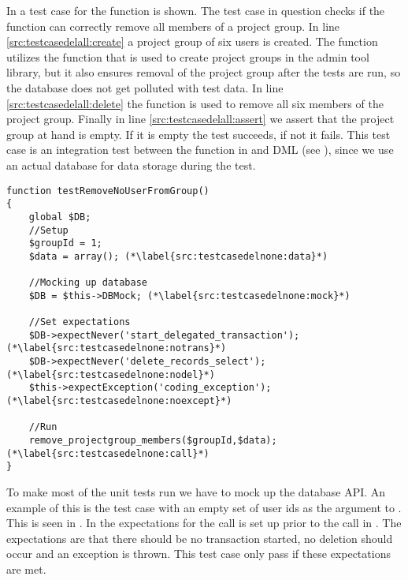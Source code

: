 In  a test case for the function  is shown.
The test case in question checks if the function can correctly remove all members of a project group. 
In line \ref{src:testcasedelall:create} a project group of six users is created.
The function  utilizes the function that is used to create project groups in the admin tool library, but it also ensures removal of the project group after the tests are run, so the database does not get polluted with test data.
In line \ref{src:testcasedelall:delete} the function  is used to remove all six members of the project group.
Finally in line \ref{src:testcasedelall:assert} we assert that the project group at hand is empty.
If it is empty the test succeeds, if not it fails.
This test case is an integration test between the function  in \admlib{} and \moodle{} DML (see ), since we use an actual database for data storage during the test.


\begin{lstlisting}[style=phpCode, caption=\myCaption{A test case for the function \fu{remove\_projectgroup\_members}. The test case tests if the function correctly handles the erronous input of an empty set of users}, label=src:testcasedelnone]
function testRemoveNoUserFromGroup()
{
	global $DB;
	//Setup
	$groupId = 1;
	$data = array(); (*\label{src:testcasedelnone:data}*)
	
	//Mocking up database
	$DB = $this->DBMock; (*\label{src:testcasedelnone:mock}*)
	
	//Set expectations
	$DB->expectNever('start_delegated_transaction'); (*\label{src:testcasedelnone:notrans}*)
	$DB->expectNever('delete_records_select'); (*\label{src:testcasedelnone:nodel}*)
	$this->expectException('coding_exception'); (*\label{src:testcasedelnone:noexcept}*)
	
	//Run
	remove_projectgroup_members($groupId,$data); (*\label{src:testcasedelnone:call}*)
}
\end{lstlisting}
To make most of the unit tests run we have to mock up the database API.
An example of this is the test case with an empty set of user ids as the argument \varuserids{} to .
This is seen in .
In  the expectations for the call is set up prior to the call in .
The expectations are that there should be no transaction started, no deletion should occur and an exception is thrown.
This test case only pass if these expectations are met.


